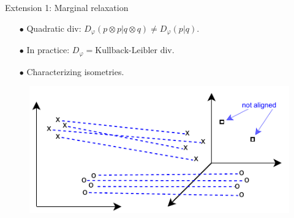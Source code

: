 \documentclass{beamer}
\begin{document}
\begin{frame}{Extension 1: Marginal relaxation}
  \begin{minipage}[t]{0.6\linewidth}
  \begin{itemize}
    \item[$\bullet$] Quadratic div: $D_{\varphi}(p \otimes p | q \otimes q) \neq D_{\varphi}(p | q)$.
    \item[$\bullet$] In practice: $D_{\varphi} = \text{Kullback-Leibler div}$.
    \item[$\bullet$] Characterizing isometries.
  \end{itemize}
  \end{minipage}%
  \hfill%
  \hspace{-6cm}
  \begin{minipage}[t]{0.5\linewidth}
    \vspace{0.2cm}
  \begin{figure}
    \centering
    \includegraphics[width=1.1\linewidth, keepaspectratio=true]{OT_new/ugw.pdf}
  \end{figure}
  \end{minipage}

\end{frame}
\end{document}

